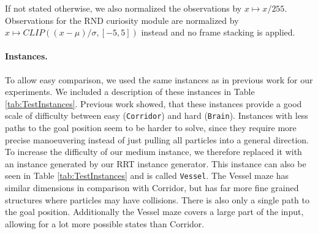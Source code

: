 If not stated otherwise, we also normalized the observations by $x \mapsto x/255$. Observations for the RND curiosity module are normalized by $x \mapsto CLIP((x-\mu)/\sigma, [-5, 5])$ instead and no frame stacking is applied.


\paragraph{Instances.}
To allow easy comparison, we used the same instances as in previous work for our experiments. We included a description of these instances in Table \ref{tab:TestInstances}. Previous work showed, that these instances provide a good scale of difficulty between easy (\texttt{Corridor}) and hard (\texttt{Brain}). Instances with less paths to the goal position seem to be harder to solve, since they require more precise manoeuvering instead of just pulling all particles into a general direction. To increase the difficulty of our medium instance, we therefore replaced it with an instance generated by our RRT instance generator. This instance can also be seen in Table \ref{tab:TestInstances} and is called \texttt{Vessel}. The Vessel maze has similar dimensions in comparison with Corridor, but has far more fine grained structures where particles may have collisions. There is also only a single path to the goal position. Additionally the Vessel maze covers a large part of the input, allowing for a lot more possible states than Corridor. 

